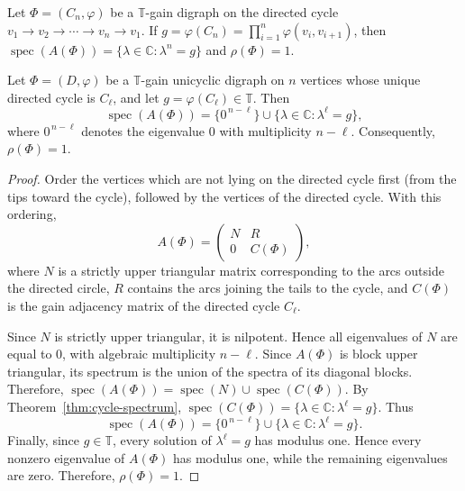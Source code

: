 \documentclass[10pt,a4paper]{amsart}
\newcommand{\TT}{\mathbb{T}}
\begin{document}
\begin{theorem}\label{thm:cycle-spectrum}
Let $\Phi=(C_n,\varphi)$ be a $\mathbb{T}$-gain digraph on the directed cycle $v_1\to v_2\to\cdots\to v_n\to v_1$. If $g=\varphi(C_n)=\prod_{i=1}^{n}\varphi(v_i,v_{i+1})$, then $\operatorname{spec}(A(\Phi)) = \{\lambda\in\mathbb{C}:\lambda^n=g\}$ and $\rho(\Phi)=1$.
\end{theorem}

\begin{theorem}
Let $\Phi=(D,\varphi)$ be a $\TT$-gain unicyclic digraph on $n$ vertices whose unique directed cycle is $C_\ell$, and let
$g=\varphi(C_\ell)\in\TT$.
Then
\[
\operatorname{spec}(A(\Phi))
=
\{0^{\,n-\ell}\}
\cup
\{\lambda\in\mathbb C:\lambda^\ell=g\},
\]
where $0^{\,n-\ell}$ denotes the eigenvalue $0$ with multiplicity
$n-\ell$. Consequently, $\rho(\Phi)=1.$
\end{theorem}

\begin{proof}
Order the vertices which are not lying on the directed cycle first (from the tips toward the cycle), followed by the vertices of the directed cycle.
With this ordering,
\[
A(\Phi)=
\begin{pmatrix}
N&R\\
0&C(\Phi)
\end{pmatrix},
\]
where $N$ is a strictly upper triangular matrix corresponding to the arcs outside the directed circle, $R$ contains the arcs joining the tails to the cycle, and $C(\Phi)$ is the gain adjacency matrix of the directed cycle
$C_\ell$.

Since $N$ is strictly upper triangular, it is nilpotent. Hence all
eigenvalues of $N$ are equal to $0$, with algebraic multiplicity
$n-\ell$. Since $A(\Phi)$ is block upper triangular, its spectrum is the union of the spectra of its diagonal blocks. Therefore,
$\operatorname{spec}(A(\Phi))
=
\operatorname{spec}(N)
\cup
\operatorname{spec}(C(\Phi))$.
By Theorem~\ref{thm:cycle-spectrum},
$\operatorname{spec}(C(\Phi))
=
\{\lambda\in\mathbb C:\lambda^\ell=g\}.$
Thus
\[
\operatorname{spec}(A(\Phi))
=
\{0^{\,n-\ell}\}
\cup
\{\lambda\in\mathbb C:\lambda^\ell=g\}.
\]
Finally, since $g\in\TT$, every solution of $\lambda^\ell=g$ has modulus one. Hence every nonzero eigenvalue of $A(\Phi)$ has modulus one, while the remaining eigenvalues are zero. Therefore,
$\rho(\Phi)=1.$
\end{proof}
\end{document}
